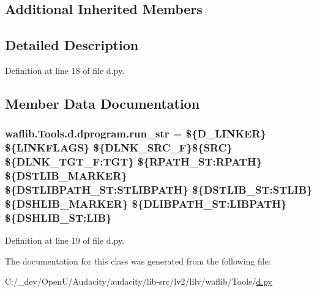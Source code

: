 \subsection*{Additional Inherited Members}


\subsection{Detailed Description}


Definition at line 18 of file d.\+py.



\subsection{Member Data Documentation}
\subsubsection[{\texorpdfstring{run\+\_\+str}{run_str}}]{ waflib.\+Tools.\+d.\+dprogram.\+run\+\_\+str = \textquotesingle{}\$\{D\+\_\+\+L\+I\+N\+K\+ER\} \$\{L\+I\+N\+K\+F\+L\+A\+GS\} \$\{D\+L\+N\+K\+\_\+\+S\+R\+C\+\_\+F\}\$\{S\+RC\} \$\{D\+L\+N\+K\+\_\+\+T\+G\+T\+\_\+\+F\+:\+T\+GT\} \$\{R\+P\+A\+T\+H\+\_\+\+S\+T\+:\+R\+P\+A\+TH\} \$\{D\+S\+T\+L\+I\+B\+\_\+\+M\+A\+R\+K\+ER\} \$\{D\+S\+T\+L\+I\+B\+P\+A\+T\+H\+\_\+\+S\+T\+:\+S\+T\+L\+I\+B\+P\+A\+TH\} \$\{D\+S\+T\+L\+I\+B\+\_\+\+S\+T\+:\+S\+T\+L\+IB\} \$\{D\+S\+H\+L\+I\+B\+\_\+\+M\+A\+R\+K\+ER\} \$\{D\+L\+I\+B\+P\+A\+T\+H\+\_\+\+S\+T\+:\+L\+I\+B\+P\+A\+TH\} \$\{D\+S\+H\+L\+I\+B\+\_\+\+S\+T\+:\+L\+IB\}\textquotesingle{}\hspace{0.3cm}{\ttfamily [static]}}\hypertarget{classwaflib_1_1_tools_1_1d_1_1dprogram_a54f16f9316f20aa540b9611022450726}{}\label{classwaflib_1_1_tools_1_1d_1_1dprogram_a54f16f9316f20aa540b9611022450726}


Definition at line 19 of file d.\+py.



The documentation for this class was generated from the following file\+:\begin{DoxyCompactItemize}
\item 
C\+:/\+\_\+dev/\+Open\+U/\+Audacity/audacity/lib-\/src/lv2/lilv/waflib/\+Tools/\hyperlink{lilv_2waflib_2_tools_2d_8py}{d.\+py}\end{DoxyCompactItemize}
